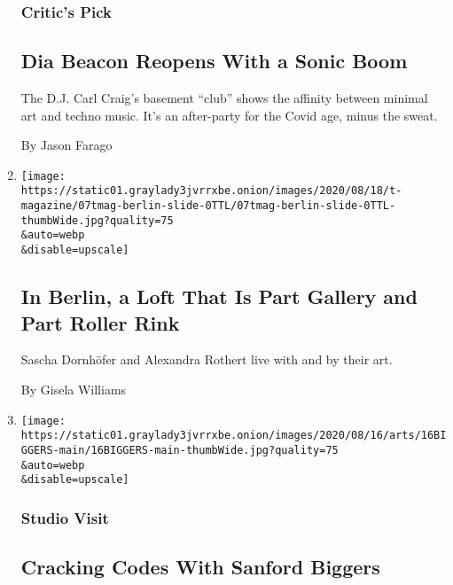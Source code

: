 \begin{enumerate}
  \hypertarget{critics-pick}{%
  \subsubsection{Critic's Pick}\label{critics-pick}}

  \hypertarget{dia-beacon-reopens-with-a-sonic-boom}{%
  \subsection{Dia Beacon Reopens With a Sonic
  Boom}\label{dia-beacon-reopens-with-a-sonic-boom}}

  The D.J. Carl Craig's basement ``club'' shows the affinity between
  minimal art and techno music. It's an after-party for the Covid age,
  minus the sweat.

  By Jason Farago
\item
  \href{/2020/08/19/t-magazine/berlin-infamous-skating-couple-design.html}{}

  \texttt{[image: https://static01.graylady3jvrrxbe.onion/images/2020/08/18/t-magazine/07tmag-berlin-slide-0TTL/07tmag-berlin-slide-0TTL-thumbWide.jpg?quality=75\\\&auto=webp\\\&disable=upscale]}

  \hypertarget{in-berlin-a-loft-that-is-part-gallery-and-part-roller-rink}{%
  \subsection{In Berlin, a Loft That Is Part Gallery and Part Roller
  Rink}\label{in-berlin-a-loft-that-is-part-gallery-and-part-roller-rink}}

  Sascha Dornhöfer and Alexandra Rothert live with and by their art.

  By Gisela Williams
\item
  \href{/2020/08/14/arts/design/sanford-biggers-quilt-bronx-museum.html}{}

  \texttt{[image: https://static01.graylady3jvrrxbe.onion/images/2020/08/16/arts/16BIGGERS-main/16BIGGERS-main-thumbWide.jpg?quality=75\\\&auto=webp\\\&disable=upscale]}

  \hypertarget{studio-visit}{%
  \subsubsection{Studio Visit}\label{studio-visit}}

  \hypertarget{cracking-codes-with-sanford-biggers}{%
  \subsection{Cracking Codes With Sanford
  Biggers}\label{cracking-codes-with-sanford-biggers}}


\end{enumerate}
